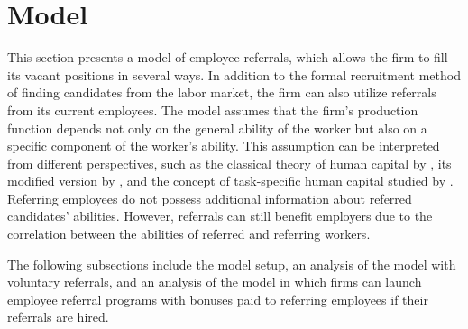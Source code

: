 \documentclass[12pt]{article}
\begin{document}


\section{Model} \label{sec:model}
This section presents a model of employee referrals, which allows the firm to fill its vacant positions in several ways. In addition to the formal recruitment method of finding candidates from the labor market, the firm can also utilize referrals from its current employees. The model assumes that the firm's production function depends not only on the general ability of the worker but also on a specific component of the worker's ability. This assumption can be interpreted from different perspectives, such as the classical theory of human capital by \cite{becker1962investment}, its modified version by \cite{lazear2009firm}, and the concept of task-specific human capital studied by \cite{gibbons2004task}. Referring employees do not possess additional information about referred candidates' abilities. However, referrals can still benefit employers due to the correlation between the abilities of referred and referring workers. 

The following subsections include the model setup, an analysis of the model with voluntary referrals, and an analysis of the model in which firms can launch employee referral programs with bonuses paid to referring employees if their referrals are hired.
\end{document}
